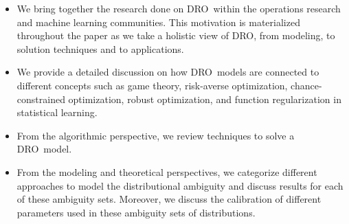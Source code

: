 \documentclass[final,onefignum,onetabnum]{class}
\newcommand{\dro}{DRO}
\begin{document}
\begin{itemize}
    \item We bring together the research done on \dro\ within the operations research and machine learning communities. This motivation is materialized throughout the  paper as we take a holistic view of \dro, from modeling, to solution techniques and to applications. %
    
    \item  We provide a detailed discussion on how  \dro\ models are connected to different concepts such as game theory, risk-averse optimization, chance-constrained optimization, robust optimization, and function regularization in statistical learning. 
    
    \item From the algorithmic perspective, we review techniques to solve a \dro\ model. %
    
    \item From the modeling and theoretical perspectives, we categorize different approaches to model the distributional ambiguity and discuss results for each of these ambiguity sets. %
    Moreover, we discuss the calibration of different parameters used in these ambiguity sets of distributions. 
    
    
\end{itemize}
\end{document}
